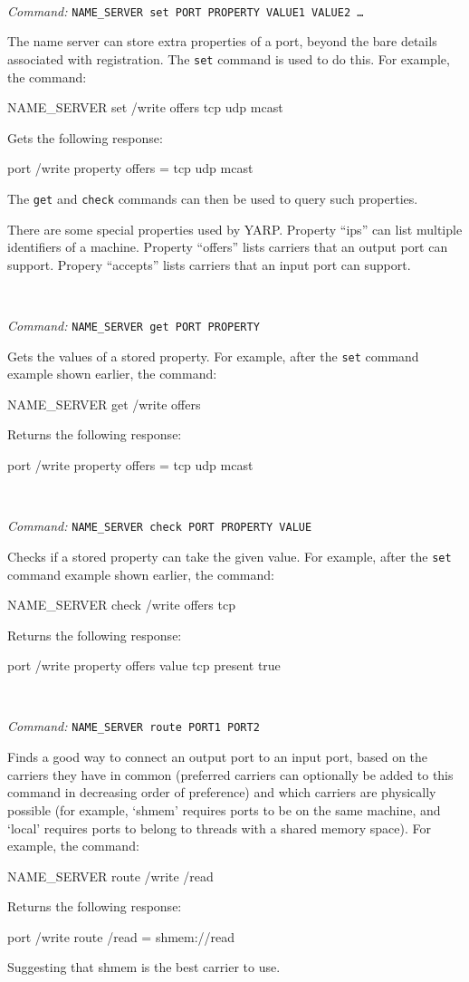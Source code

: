 \documentclass[a4]{article}
\newenvironment{packed_itemize}{
\begin{itemize}
  \renewcommand{\labelitemi}{$\triangleright$}
  \setlength{\itemsep}{1pt}
  \setlength{\parskip}{0pt}
  \setlength{\parsep}{0pt}
}{\end{itemize}}
\newcommand{\newusage}{\ \\\noindent\makebox[\textwidth]{\hrulefill}}
\newcommand{\usage}[1]{ \begin{packed_itemize} \item {\it Command:} {\tt #1} \end{packed_itemize}}
\begin{document}
\newusage{}
\usage{NAME\_SERVER set PORT PROPERTY VALUE1 VALUE2 \ldots}

The name server can store extra properties of a port, beyond the
bare details associated with registration.  The {\tt set} command
is used to do this.  For example, the command:
\begin{code}
NAME_SERVER set /write offers tcp udp mcast
\end{code}
Gets the following response:
\begin{code}
port /write property offers = tcp udp mcast
\end{code}
The {\tt get} and {\tt check} commands can then be used to query
such properties.

There are some special properties used by YARP.  Property ``ips''
can list multiple identifiers of a machine.  Property ``offers''
lists carriers that an output port can support.  Propery ``accepts''
lists carriers that an input port can support.




\newusage
\usage{NAME\_SERVER get PORT PROPERTY}
Gets the values of a stored property. For example, 
after the {\tt set} command example shown earlier, the command:
\begin{code}
NAME_SERVER get /write offers
\end{code}
Returns the following response:
\begin{code}
port /write property offers = tcp udp mcast
\end{code}

\newusage
\usage{NAME\_SERVER check PORT PROPERTY VALUE}
Checks if a stored property can take the given value. For example, 
after the {\tt set} command example shown earlier, the command:
\begin{code}
NAME_SERVER check /write offers tcp
\end{code}
Returns the following response:
\begin{code}
port /write property offers value tcp present true
\end{code}

\newusage
\usage{NAME\_SERVER route PORT1 PORT2}
Finds a good way to connect an output port to an input port, based
on the carriers they have in common (preferred carriers can optionally
be added to this command in decreasing order of preference) and
which carriers are physically possible (for example, `shmem'
requires ports to be on the same machine, and `local' requires
ports to belong to threads with a shared memory space).
For example, the command:
\begin{code}
NAME_SERVER route /write /read
\end{code}
Returns the following response:
\begin{code}
port /write route /read = shmem://read
\end{code}
Suggesting that shmem is the best carrier to use.
\end{document}
